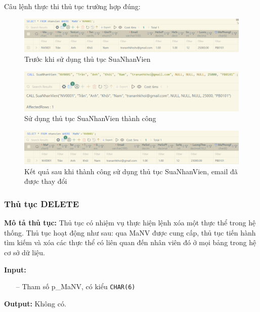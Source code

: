 \newpage
Câu lệnh thực thi thủ tục trường hợp đúng:
\begin{figure}[H]
    \centering
    \includegraphics[width=\linewidth]{content/images/SuaNhanVien_Before.png}
    \caption{Trước khi sử dụng thủ tục SuaNhanVien}
    \label{fig:SuaNhanVien_Before}
\end{figure}
\begin{figure}[H]
    \centering
    \includegraphics[width=\linewidth]{content/images/SuaNhanVien_ThanhCong.png}
    \caption{Sử dụng thủ tục SuaNhanVien thành công}
    \label{fig:SuaNhanVien_ThanhCong}
\end{figure}
\begin{figure}[H]
    \centering
    \includegraphics[width=\linewidth]{content/images/SuaNhanVien_After.png}
    \caption{Kết quả sau khi thành công sử dụng thủ tục SuaNhanVien, email đã được thay đổi}
    \label{fig:SuaNhanVien_After}
\end{figure}


\newpage
\subsubsection{Thủ tục DELETE}
\textbf{Mô tả thủ tục:} Thủ tục có nhiệm vụ thực hiện lệnh xóa một thực thể trong hệ thống. Thủ tục hoạt động như sau: qua MaNV được cung cấp, thủ tục tiến hành tìm kiếm và xóa các thực thể có liên quan đến nhân viên đó ở mọi bảng trong hệ cơ sở dữ liệu.

\textbf{Input:} 
\begin{itemize}
    \item [--] Tham số p\_MaNV, có kiểu \texttt{CHAR(6)}
\end{itemize}

\textbf{Output:} Không có.

